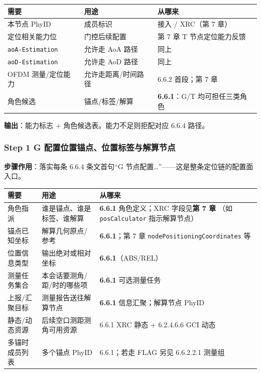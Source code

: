 \documentclass[11pt,a4paper]{ctexart}
\begin{document}
\begin{table}[h]
\centering
\small
\begin{tabular}{L{3.4cm}L{4.8cm}L{4.8cm}}
\toprule
\textbf{需要} & \textbf{用途} & \textbf{从哪来} \\
\midrule
本节点 PhyID & 成员标识 & 接入 / XRC（第 7 章） \\
定位相关能力位 & 门控后续配置 & 第 7 章 T 节点定位能力反馈 \\
\quad \texttt{aoA-Estimation} & 允许走 AoA 路径 & 同上 \\
\quad \texttt{aoD-Estimation} & 允许走 AoD 路径 & 同上 \\
\quad OFDM 测量/定位能力 & 允许走距离/时间路径 & 6.6.2 首段；第 7 章 \\
角色候选 & 锚点/标签/解算 & \textbf{6.6.1}：G/T 均可担任三类角色 \\
\bottomrule
\end{tabular}
\end{table}

\textbf{输出}：能力标志 + 角色候选表。能力不足则拒配对应 6.6.4 路径。

\subsubsection{Step 1 G 配置位置锚点、位置标签与解算节点}

\textbf{步骤作用}：落实每条 6.6.4 条文首句``G 节点配置\ldots''——这是整条定位链的配置面入口。

\begin{table}[h]
\centering
\small
\begin{tabular}{L{3.4cm}L{4.8cm}L{4.8cm}}
\toprule
\textbf{需要} & \textbf{用途} & \textbf{从哪来} \\
\midrule
角色指派 & 谁是锚点、谁是标签、谁解算 &
  \textbf{6.6.1} 角色定义；XRC 字段见\textbf{第 7 章}
  （如 \texttt{posCalculator} 指示解算节点） \\
锚点已知坐标 & 解算几何原点/参考 &
  \textbf{6.6.1}；第 7 章 \texttt{nodePositioningCoordinates} 等 \\
位置信息类型 & 输出绝对或相对坐标 & \textbf{6.6.1}（ABS/REL） \\
测量任务集合 & 本会话要测角/距/时的哪些项 & \textbf{6.6.1} 可选测量任务 \\
上报/汇聚目标 & 测量报告送往解算节点 & \textbf{6.6.1} 信息汇聚；解算节点 PhyID \\
静态/动态资源 & 后续空口测距测角可用资源 &
  6.6.1 XRC 静态 + 6.2.4.6.6 GCI 动态 \\
多锚时成员列表 & 多个锚点 PhyID &
  6.6.1；若走 FLAG 另见 6.6.2.2.1 测量组 \\
\bottomrule
\end{tabular}
\end{table}
\end{document}
